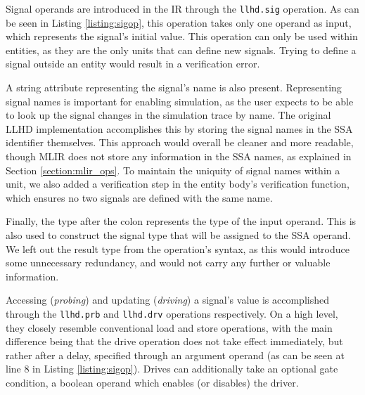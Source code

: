 Signal operands are introduced in the IR through the \texttt{llhd.sig} operation. As can be seen in Listing \ref{listing:sigop}, this operation takes only one operand as input, which represents the signal's initial value. This operation can only be used within entities, as they are the only units that can define new signals. Trying to define a signal outside an entity would result in a verification error.


A string attribute representing the signal's name is also present. Representing signal names is important for enabling simulation, as the user expects to be able to look up the signal changes in the simulation trace by name. The original LLHD implementation accomplishes this by storing the signal names in the SSA identifier themselves. This approach would overall be cleaner and more readable, though MLIR does not store any information in the SSA names, as explained in Section \ref{section:mlir_ops}. To maintain the uniquity of signal names within a unit, we also added a verification step in the entity body's verification function, which ensures no two signals are defined with the same name.

Finally, the type after the colon represents the type of the input operand. This is also used to construct the signal type that will be assigned to the SSA operand. We left out the result type from the operation's syntax, as this would introduce some unnecessary redundancy, and would not carry any further or valuable information.

Accessing (\textit{probing}) and updating (\textit{driving}) a signal's value is accomplished through the \texttt{llhd.prb} and \texttt{llhd.drv} operations respectively. On a high level, they closely resemble conventional load and store operations, with the main difference being that the drive operation does not take effect immediately, but rather after a delay, specified through an argument operand (as can be seen at line $8$ in Listing \ref{listing:sigop}). Drives can additionally take an optional gate condition, a boolean operand which enables (or disables) the driver.


